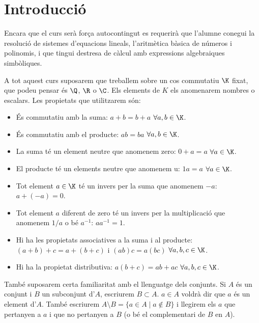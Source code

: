 \section*{Introducció}
Encara que el curs serà força autocontingut es requerirà que l'alumne conegui la resolució de sistemes d'equacions lineals, l'aritmètica bàsica de números i polinomis, i que tingui destresa de càlcul amb expressions algebraiques simbòliques.

A tot aquest curs suposarem que treballem sobre un cos commutatiu $\K$ fixat, que podeu pensar és $\Q$, $\R$ o $\C$. Els elements de $K$ els anomenarem nombres o escalars. Les propietats que utilitzarem són:
\begin{itemize}
	\item És commutatiu amb la suma: $a+b=b+a$ $\forall a,b\in \K$.
	\item És commutatiu amb el producte: $ab=ba$ $\forall a,b\in \K$.
	\item La suma té un element neutre que anomenem zero: $0+a=a$ $\forall a\in\K$.
	\item El producte té un elements neutre que anomenem u: $1a=a$ $\forall a\in\K$.
	\item Tot element $a\in\K$ té un invers per la suma que anomenem $-a$: $a+(-a)=0$.
	\item Tot element $a$ diferent de zero té un invers per la multiplicació que anomenem $1/a$ o bé $a^{-1}$: $a a^{-1}=1$.
	\item Hi ha les propietats associatives a la suma i al producte: $(a+b)+c=a+(b+c)$ i $(ab)c=a(bc)$ $\forall a,b,c \in \K$.
	\item Hi ha la propietat distributiva: $a(b+c)=ab+ac$ $\forall a,b,c \in \K$.
\end{itemize}

També suposarem certa familiaritat amb el llenguatge dels conjunts. Si $A$ és un conjunt i $B$ un subconjunt d'$A$, escriurem $B\subset A$. $a\in A$ voldrà dir que $a$ és un element d'$A$. També escriurem $A\setminus B=\{a \in A \mid a \not\in B\}$ i llegirem els $a$ que pertanyen a $a$ i que no pertanyen a $B$ (o bé el complementari de $B$ en $A$). 
 
